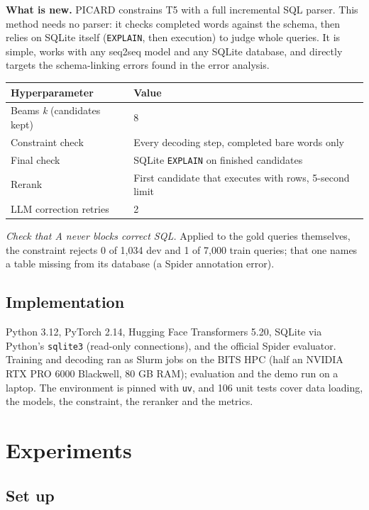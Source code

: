\documentclass[
  10pt,
]{article}
\newcounter{none} %
\begin{document}
\textbf{What is new.} PICARD constrains T5 with a full incremental SQL
parser. This method needs no parser: it checks completed words against
the schema, then relies on SQLite itself (\texttt{EXPLAIN}, then
execution) to judge whole queries. It is simple, works with any seq2seq
model and any SQLite database, and directly targets the schema-linking
errors found in the error analysis.

{\def\LTcaptype{none} %
\begin{longtable}[]{@{}ll@{}}
\toprule\noalign{}
Hyperparameter & Value \\
\midrule\noalign{}
\endhead
\bottomrule\noalign{}
\endlastfoot
Beams \emph{k} (candidates kept) & 8 \\
Constraint check & Every decoding step, completed bare words only \\
Final check & SQLite \texttt{EXPLAIN} on finished candidates \\
Rerank & First candidate that executes with rows, 5-second limit \\
LLM correction retries & 2 \\
\end{longtable}
}

\emph{Check that A never blocks correct SQL.} Applied to the gold
queries themselves, the constraint rejects 0 of 1,034 dev and 1 of 7,000
train queries; that one names a table missing from its database (a
Spider annotation error).

\subsection{Implementation}\label{implementation}

Python 3.12, PyTorch 2.14, Hugging Face Transformers 5.20, SQLite via
Python's \texttt{sqlite3} (read-only connections), and the official
Spider evaluator. Training and decoding ran as Slurm jobs on the BITS
HPC (half an NVIDIA RTX PRO 6000 Blackwell, 80 GB RAM); evaluation and
the demo run on a laptop. The environment is pinned with \texttt{uv},
and 106 unit tests cover data loading, the models, the constraint, the
reranker and the metrics.

\section{Experiments}\label{experiments}

\subsection{Set up}\label{set-up}
\end{document}
